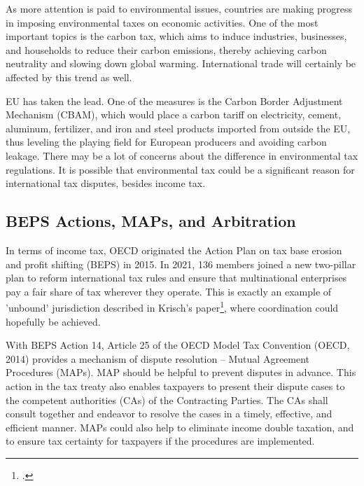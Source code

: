 As more attention is paid to environmental issues, countries are making progress in imposing environmental taxes on economic activities. One of the most important topics is the carbon tax, which aims to induce industries, businesses, and households to reduce their carbon emissions, thereby achieving carbon neutrality and slowing down global warming. International trade will certainly be affected by this trend as well.

EU has taken the lead. One of the measures is the Carbon Border Adjustment Mechanism (CBAM), which would place a carbon tariff on electricity, cement, aluminum, fertilizer, and iron and steel products imported from outside the EU, thus leveling the playing field for European producers and avoiding carbon leakage.
There may be a lot of concerns about the difference in environmental tax regulations. It is possible that environmental tax could be a significant reason for international tax disputes, besides income tax.



\subsection{BEPS Actions, MAPs, and Arbitration}
In terms of income tax, OECD originated the Action Plan on tax base erosion and profit shifting (BEPS) in 2015. In 2021, 136 members joined a new two-pillar plan to reform international tax rules and ensure that multinational enterprises pay a fair share of tax wherever they operate. This is exactly an example of 'unbound' jurisdiction described in Krisch's paper\footcite{Krisch2022}, where coordination could hopefully be achieved. 


With BEPS Action 14, Article 25 of the OECD Model Tax Convention (OECD, 2014) provides a mechanism of dispute resolution -- Mutual Agreement Procedures (MAPs). MAP should be helpful to prevent disputes in advance. This action in the tax treaty also enables taxpayers to present their dispute cases to the competent authorities (CAs) of the Contracting Parties. The CAs shall consult together and endeavor to resolve the cases in a timely, effective, and efficient manner. MAPs could also help to eliminate income double taxation, and to ensure tax certainty for taxpayers if the procedures are implemented.

